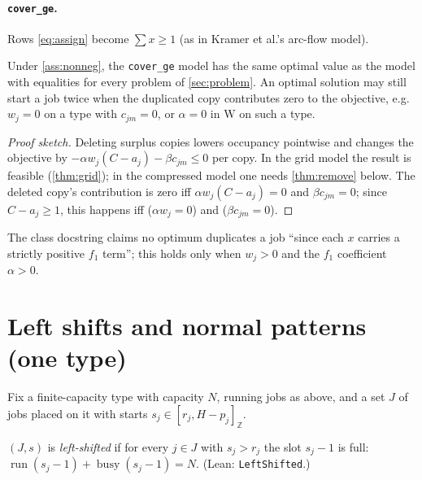 \documentclass[11pt,a4paper]{article}
\newcommand{\Run}{\operatorname{run}}
\newcommand{\Busy}{\operatorname{busy}}
\newcommand{\Z}{\mathbb{Z}}
\newcommand{\code}[1]{\texttt{#1}}
\newcommand{\lean}[1]{\texttt{\small #1}}
\begin{document}
\paragraph{\code{cover\_ge}.} Rows \eqref{eq:assign} become
$\sum x\ge 1$ (as in Kramer et al.'s arc-flow model).

\begin{proposition}\label{prop:coverge}
Under \cref{ass:nonneg}, the \code{cover\_ge} model has the same optimal value
as the model with equalities for every problem of \cref{sec:problem}. An
optimal solution may still start a job twice when the duplicated copy
contributes zero to the objective, e.g. $w_j=0$ on a type with $c_{jm}=0$,
or $\alpha=0$ in $\mathrm W$ on such a type.
\end{proposition}
\begin{proof}[Proof sketch]
Deleting surplus copies lowers occupancy pointwise and changes the objective
by $-\alpha w_j(C-a_j)-\beta c_{jm}\le0$ per copy. In the grid model the
result is feasible (\cref{thm:grid}); in the compressed model one needs
\cref{thm:remove} below. The deleted copy's contribution is zero iff
$\alpha w_j(C-a_j)=0$ and $\beta c_{jm}=0$; since $C-a_j\ge1$, this happens
iff ($\alpha w_j=0$) and ($\beta c_{jm}=0$).
\end{proof}
The class docstring claims no optimum duplicates a job ``since each $x$
carries a strictly positive $f_1$ term''; this holds only when $w_j>0$ and
the $f_1$ coefficient $\alpha>0$.

\section{Left shifts and normal patterns (one type)}\label{sec:leftshift}

Fix a finite-capacity type with capacity $N$, running jobs as above, and a set
$J$ of jobs placed on it with starts $s_j\in[r_j,H-p_j]_\Z$.

\begin{definition}
$(J,s)$ is \emph{left-shifted} if for every $j\in J$ with $s_j>r_j$ the slot
$s_j-1$ is full: $\Run(s_j-1)+\Busy(s_j-1)=N$. (Lean: \lean{LeftShifted}.)
\end{definition}
\end{document}
